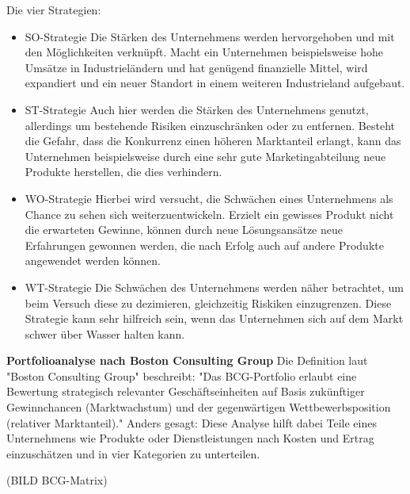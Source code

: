   Die vier Strategien:
  \begin{itemize}
    \item SO-Strategie
    Die Stärken des Unternehmens werden hervorgehoben und mit den Möglichkeiten verknüpft. Macht ein Unternehmen beispielsweise hohe Umsätze in Industrieländern und hat
    genügend finanzielle Mittel, wird expandiert und ein neuer Standort in einem weiteren Industrieland aufgebaut.

    \item ST-Strategie
    Auch hier werden die Stärken des Unternehmens genutzt, allerdings um bestehende Risiken einzuschränken oder zu entfernen. Besteht die Gefahr, dass die Konkurrenz
    einen höheren Marktanteil erlangt, kann das Unternehmen beispielsweise durch eine sehr gute Marketingabteilung neue Produkte herstellen, die dies verhindern.

    \item WO-Strategie
    Hierbei wird versucht, die Schwächen eines Unternehmens als Chance zu sehen sich weiterzuentwickeln. Erzielt ein gewisses Produkt nicht die erwarteten Gewinne,
    können durch neue Lösungsansätze neue Erfahrungen gewonnen werden, die nach Erfolg auch auf andere Produkte angewendet werden können.

    \item WT-Strategie
    Die Schwächen des Unternehmens werden näher betrachtet, um beim Versuch diese zu dezimieren, gleichzeitig Riskiken einzugrenzen. Diese Strategie kann sehr hilfreich
    sein, wenn das Unternehmen sich auf dem Markt schwer über Wasser halten kann.

  \end{itemize}
  \textbf{Portfolioanalyse nach Boston Consulting Group}
  Die Definition laut {"Boston Consulting Group"\cite{portfolioanalyse}} beschreibt:
  "Das BCG-Portfolio erlaubt eine Bewertung strategisch relevanter Geschäftseinheiten auf Basis zukünftiger Gewinnchancen (Marktwachstum) und der
  gegenwärtigen Wettbewerbsposition (relativer Marktanteil)." Anders gesagt: Diese Analyse hilft dabei Teile eines Unternehmens wie Produkte oder Dienstleistungen
  nach Kosten und Ertrag einzuschätzen und in vier Kategorien zu unterteilen.

  (BILD BCG-Matrix)

